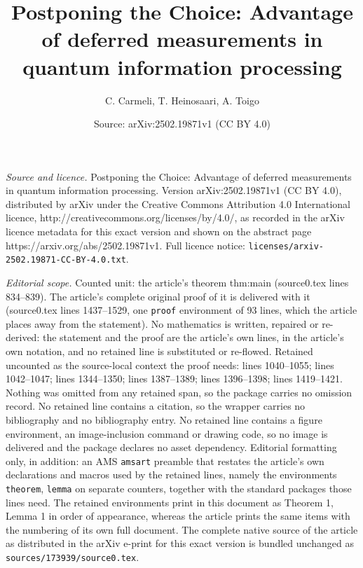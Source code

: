\documentclass[10pt,a4paper]{amsart}
\title{Postponing the Choice: Advantage of deferred measurements in quantum information processing}
\author{C. Carmeli, T. Heinosaari, A. Toigo}
\date{Source: arXiv:2502.19871v1 (CC BY 4.0)}
\begin{document}
\maketitle

\noindent\emph{Source and licence.} Postponing the Choice: Advantage of deferred measurements in quantum information processing. Version arXiv:2502.19871v1 (CC BY 4.0), distributed by arXiv under the Creative Commons Attribution 4.0 International licence, http://creativecommons.org/licenses/by/4.0/, as recorded in the arXiv licence metadata for this exact version and shown on the abstract page https://arxiv.org/abs/2502.19871v1. Full licence notice: \texttt{licenses/arxiv-2502.19871-CC-BY-4.0.txt}.\par\smallskip

\noindent\textit{Editorial scope.} Counted unit: the article's theorem thm:main (source0.tex lines 834--839). The article's complete original proof of it is delivered with it (source0.tex lines 1437--1529, one \texttt{proof} environment of 93 lines, which the article places away from the statement). No mathematics is written, repaired or re-derived: the statement and the proof are the article's own lines, in the article's own notation, and no retained line is substituted or re-flowed.  Retained uncounted as the source-local context the proof needs: lines 1040--1055; lines 1042--1047; lines 1344--1350; lines 1387--1389; lines 1396--1398; lines 1419--1421.  Nothing was omitted from any retained span, so the package carries no omission record.  No retained line contains a citation, so the wrapper carries no bibliography and no bibliography entry.  No retained line contains a figure environment, an image-inclusion command or drawing code, so no image is delivered and the package declares no asset dependency.  Editorial formatting only, in addition: an AMS \texttt{amsart} preamble that restates the article's own declarations and macros used by the retained lines, namely the environments \texttt{theorem}, \texttt{lemma} on separate counters, together with the standard packages those lines need.  The retained environments print in this document as Theorem 1, Lemma 1 in order of appearance, whereas the article prints the same items with the numbering of its own full document.  The complete native source of the article as distributed in the arXiv e-print for this exact version is bundled unchanged as \texttt{sources/173939/source0.tex}.
\end{document}
